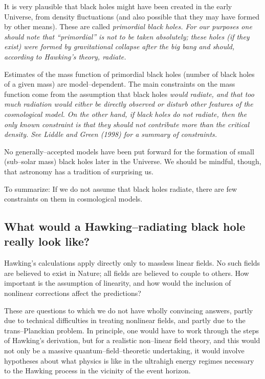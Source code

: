 It is very plausible that black holes might have been created in the early
Universe, from density fluctuations (and also possible that they may have formed
by other means).  These are called \it primordial black
holes. \rm  For our purposes one should note that ``primordial'' is not to be
taken absolutely; these holes (if they exist) were formed by gravitational
collapse after the big bang and should, according to Hawking's theory, radiate.

Estimates of the mass function of primordial black holes (number of black holes
of a given mass) are model--dependent.  The main constraints on the mass
function come from the assumption that black holes \it would \rm radiate, and
that too much radiation would either be directly observed or disturb other
features of the cosmological model. On the other hand, if black holes do not
radiate, then the only known constraint is that they should not contribute more
than the critical density.  See Liddle and Green (1998) for a summary of
constraints.

No generally--accepted models have been put forward for the formation of  small
(sub--solar mass) black holes later in the Universe.  We should be mindful,
though, that astronomy has a tradition of surprising us.

To summarize:  If we do not assume that black holes radiate, there are few
constraints on them in cosmological models.  


\subsection{What would a Hawking--radiating black hole really look
like?}

Hawking's calculations apply directly only to massless linear fields.
No such fields are believed to exist in Nature; all fields are
believed to couple to others.  How important is the assumption of
linearity, and how would the inclusion of nonlinear corrections affect
the predictions?

These are questions to which we do not have wholly convincing
answers, partly due to technical difficulties in treating nonlinear
fields, and partly due to the trans--Planckian problem.
In principle, one would have to work through the steps of Hawking's
derivation, but for a realistic non--linear field theory, and this
would not only be a massive quantum--field--theoretic undertaking, it
would involve hypotheses about what physics is like in the ultrahigh
energy regimes necessary to the Hawking process in the vicinity of the
event horizon.

